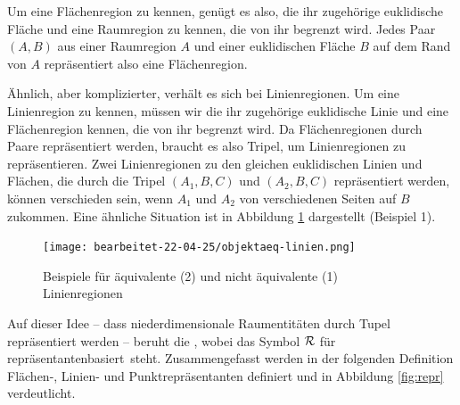         Um eine Flächenregion zu kennen, genügt es also, die ihr zugehörige euklidische Fläche und eine Raumregion zu kennen, die von ihr begrenzt wird.
        Jedes Paar $(A,B)$ aus einer Raumregion $A$ und einer euklidischen Fläche $B$ auf dem Rand von $A$ repräsentiert also eine Flächenregion.

        Ähnlich, aber komplizierter, verhält es sich bei Linienregionen. 
        Um eine Linienregion zu kennen, müssen wir die ihr zugehörige euklidische Linie und eine Flächenregion kennen, die von ihr begrenzt wird. 
        Da Flächenregionen durch Paare repräsentiert werden, braucht es also Tripel, um Linienregionen zu repräsentieren.
        Zwei Linienregionen zu den gleichen euklidischen Linien und Flächen, die durch die Tripel $(A_1, B, C)$ und $(A_2, B, C)$ repräsentiert werden, können verschieden sein, wenn $A_1$ und $A_2$ von verschiedenen Seiten auf $B$ zukommen. 
        Eine ähnliche Situation ist in Abbildung \ref{fig:objektaeq-linien} dargestellt (Beispiel 1).

        \begin{figure}[ht]
            \centering
            \texttt{[image: bearbeitet-22-04-25/objektaeq-linien.png]}
            \caption{Beispiele für äquivalente (2) und nicht äquivalente (1) Linienregionen}
            \label{fig:objektaeq-linien}
        \end{figure}
        
        Auf dieser Idee -- dass niederdimensionale Raumentitäten durch Tupel repräsentiert werden -- beruht die \strukt, wobei das Symbol $\mathcal{R}$ für \glqq repräsentantenbasiert\grqq\ steht.
        Zusammengefasst werden in der folgenden Definition Flächen-, Linien- und Punktrepräsentanten definiert und in Abbildung \ref{fig:repr} verdeutlicht.

